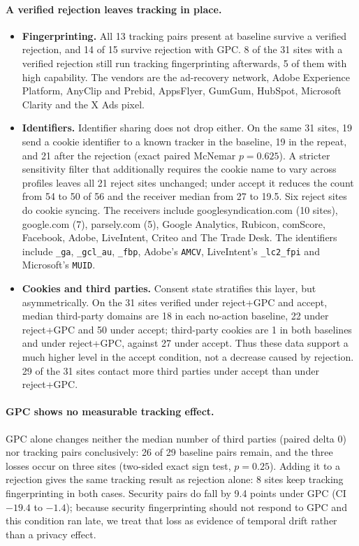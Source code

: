 \documentclass[sigconf,review,anonymous]{acmart}
\begin{document}
\paragraph{A verified rejection leaves tracking in place.}
\begin{itemize}
\item \textbf{Fingerprinting.} All 13 tracking pairs present at baseline survive a verified
  rejection, and 14 of 15 survive rejection with GPC. 8 of the 31 sites with a verified
  rejection still run tracking fingerprinting afterwards, 5 of them with high capability. The
  vendors are the ad-recovery network, Adobe Experience Platform, AnyClip and Prebid, AppsFlyer,
  GumGum, HubSpot, Microsoft Clarity and the X Ads pixel.
\item \textbf{Identifiers.} Identifier sharing does not drop either. On the same 31 sites, 19 send
  a cookie identifier to a known tracker in the baseline, 19 in the repeat, and 21 after the
  rejection (exact paired McNemar $p=0.625$). A stricter sensitivity filter that additionally
  requires the cookie name to vary across profiles leaves all 21 reject sites unchanged; under
  accept it reduces the count from 54 to 50 of 56 and the receiver median from 27 to 19.5.
  Six reject sites do cookie syncing. The receivers include googlesyndication.com (10
  sites), google.com (7), parsely.com (5), Google Analytics, Rubicon, comScore, Facebook, Adobe,
  LiveIntent, Criteo and The Trade Desk. The identifiers include \texttt{\_ga},
  \texttt{\_gcl\_au}, \texttt{\_fbp}, Adobe's \texttt{AMCV}, LiveIntent's \texttt{\_lc2\_fpi} and
  Microsoft's \texttt{MUID}.
\item \textbf{Cookies and third parties.} Consent state stratifies this layer, but asymmetrically.
  On the 31 sites verified under reject+GPC and accept, median third-party domains are 18 in
  each no-action baseline, 22 under reject+GPC and 50 under accept; third-party cookies are 1
  in both baselines and under reject+GPC, against 27 under accept. Thus these data support a
  much higher level in the accept condition, not a decrease caused by rejection. 29 of the 31
  sites contact more third parties under accept than under reject+GPC.
\end{itemize}

\paragraph{GPC shows no measurable tracking effect.} GPC alone changes neither the median number
of third parties (paired delta 0) nor tracking pairs conclusively: 26 of 29 baseline pairs remain,
and the three losses occur on three sites (two-sided exact sign test, $p=0.25$). Adding it
to a rejection gives the same tracking result as rejection alone: 8 sites keep tracking
fingerprinting in both cases. Security pairs do fall by 9.4 points under GPC (CI $-19.4$ to
$-1.4$); because security fingerprinting should not respond to GPC and this condition ran late,
we treat that loss as evidence of temporal drift rather than a privacy effect.
\end{document}
